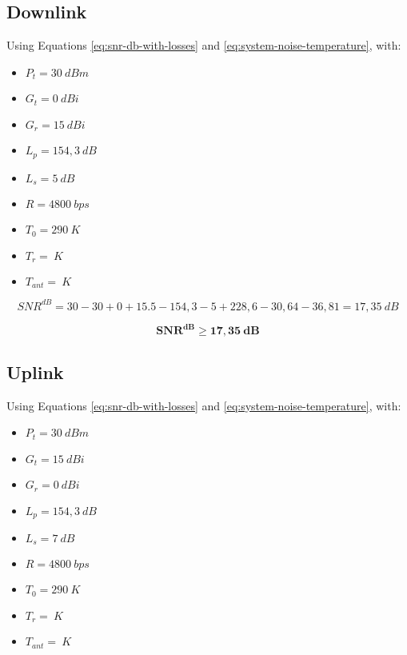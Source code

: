 \subsection{Downlink}

Using Equations \ref{eq:snr-db-with-losses} and \ref{eq:system-noise-temperature}, with:

\begin{itemize}
    \item $P_{t} = 30\ dBm$
    \item $G_{t} = 0\ dBi$
    \item $G_{r} = 15\ dBi$
    \item $L_{p} = 154,3\ dB$
    \item $L_{s} = 5\ dB$
    \item $R = 4800\ bps$
    \item $T_{0} = 290\ K$
    \item $T_{r} = \ K$
    \item $T_{ant} = \ K$
\end{itemize}

\begin{equation}
    SNR^{dB} = 30 - 30 + 0 + 15.5 - 154,3 - 5 + 228,6 - 30,64 - 36,81 = 17,35\ dB
\end{equation}

\begin{equation}
\mathbf{SNR^{dB} \geq 17,35\ dB}
\end{equation}

\subsection{Uplink}

Using Equations \ref{eq:snr-db-with-losses} and \ref{eq:system-noise-temperature}, with:

\begin{itemize}
    \item $P_{t} = 30\ dBm$
    \item $G_{t} = 15\ dBi$
    \item $G_{r} = 0\ dBi$
    \item $L_{p} = 154,3\ dB$
    \item $L_{s} = 7\ dB$
    \item $R = 4800\ bps$
    \item $T_{0} = 290\ K$
    \item $T_{r} = \ K$
    \item $T_{ant} = \ K$
\end{itemize}

